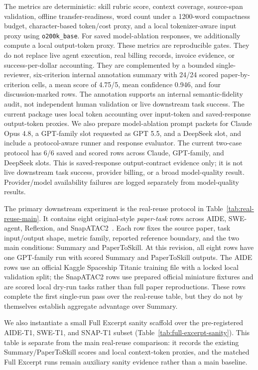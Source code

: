 The metrics are deterministic: skill rubric score, context coverage,
source-span validation, offline transfer-readiness, word count under a
1200-word compactness budget, character-based token/cost proxy, and a local
tokenizer-aware input proxy using \texttt{o200k\_base}. For saved
model-ablation responses, we additionally compute a local output-token proxy.
These metrics are reproducible gates. They do not replace live agent execution,
real billing records, invoice evidence, or success-per-dollar accounting. They
are complemented by a bounded single-reviewer, six-criterion internal
annotation summary with 24/24 scored paper-by-criterion cells, a mean score of
4.75/5, mean confidence 0.946, and four discussion-marked rows. The annotation
supports an internal semantic-fidelity audit, not independent human validation
or live downstream task success.
The current package uses local token accounting over input-token and
saved-response output-token proxies. We also
prepare model-ablation prompt packets for Claude Opus 4.8, a GPT-family slot
requested as GPT 5.5, and a DeepSeek slot, and include a protocol-aware runner
and response evaluator. The current two-case protocol has 6/6 saved and scored
rows across Claude, GPT-family, and DeepSeek slots. This is saved-response
output-contract evidence only; it is not live downstream task success,
provider billing, or a broad model-quality result. Provider/model availability
failures are logged separately from model-quality results.

The primary downstream experiment is the real-reuse protocol in
Table~\ref{tab:real-reuse-main}. It contains eight original-style
\emph{paper-task} rows across AIDE, SWE-agent, Reflexion, and
SnapATAC2~\cite{zhang2024snapatac2}. Each
row fixes the source paper, task input/output shape, metric family, reported
reference boundary, and the two main conditions: Summary and PaperToSkill. At
this revision, all eight rows have one GPT-family run with scored Summary and
PaperToSkill outputs. The AIDE rows use an official Kaggle Spaceship Titanic
training file with a locked local validation split; the SnapATAC2 rows use
prepared official miniature fixtures and are scored local dry-run tasks rather
than full paper reproductions. These rows complete the first single-run pass
over the real-reuse table, but they do not by themselves establish aggregate
advantage over Summary.

We also instantiate a small Full Excerpt sanity scaffold over the
pre-registered AIDE-T1, SWE-T1, and SNAP-T1 subset
(Table~\ref{tab:full-excerpt-sanity}). This table is separate from the main
real-reuse comparison: it records the existing Summary/PaperToSkill scores and
local context-token proxies, and the matched Full Excerpt runs remain
auxiliary sanity evidence rather than a main baseline.

